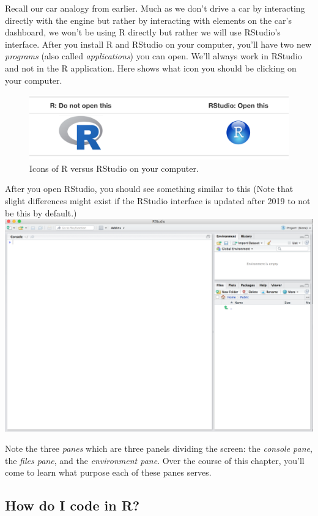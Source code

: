\documentclass[
]{article}
\begin{document}
Recall our car analogy from earlier. Much as we don't drive a car by
interacting directly with the engine but rather by interacting with
elements on the car's dashboard, we won't be using R directly but rather
we will use RStudio's interface. After you install R and RStudio on your
computer, you'll have two new \emph{programs} (also called
\emph{applications}) you can open. We'll always work in RStudio and not
in the R application. Here shows what icon you should be clicking on
your computer.

\begin{figure}
\centering
\includegraphics{../Figs/r_vs_rstudio.png}
\caption{Icons of R versus RStudio on your computer.}
\end{figure}

After you open RStudio, you should see something similar to this (Note
that slight differences might exist if the RStudio interface is updated
after 2019 to not be this by default.)
\includegraphics{../Figs/rstudio.png}

Note the three \emph{panes} which are three panels dividing the screen:
the \emph{console pane}, the \emph{files pane}, and the
\emph{environment pane}. Over the course of this chapter, you'll come to
learn what purpose each of these panes serves.

\hypertarget{code}{%
\subsection{How do I code in R?}\label{code}}
\end{document}
